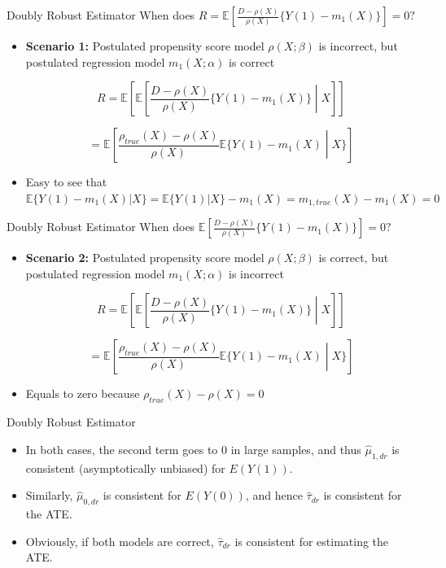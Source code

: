 \documentclass{beamer}
\begin{document}
\begin{frame}{Doubly Robust Estimator}
    When does \( R = \mathbb{E} \left[ \frac{D - \rho(X)}{\rho(X)} \{Y(1) - m_1(X)\} \right] = 0? \)

    \begin{itemize}
        \item \textbf{Scenario 1:} Postulated propensity score model \( \rho(X; \beta) \) is
        incorrect, but postulated regression model \( m_1(X; \alpha) \) is correct

        \[
        R = \mathbb{E} \left[ \mathbb{E} \left[ \frac{D - \rho(X)}{\rho(X)} \{Y(1) - m_1(X)\} \middle| X \right] \right]
        \]

        \[
        = \mathbb{E} \left[ \frac{\rho_{true}(X) - \rho(X)}{\rho(X)} \mathbb{E} \{Y(1) - m_1(X) \middle| X\} \right]
        \]

\item Easy to see that \( \mathbb{E} \{Y(1) - m_1(X) | X\} = \mathbb{E} \{Y(1) | X\} - m_1(X) = m_{1,true}(X) - m_1(X) = 0 \)

    \end{itemize}
\end{frame}


\begin{frame}{Doubly Robust Estimator}
    When does \( \mathbb{E} \left[ \frac{D - \rho(X)}{\rho(X)} \{Y(1) - m_1(X)\} \right] = 0? \)

    \begin{itemize}
        \item \textbf{Scenario 2:} Postulated propensity score model \( \rho(X; \beta) \) is correct,
        but postulated regression model \( m_1(X; \alpha) \) is incorrect

        \[
        R = \mathbb{E} \left[ \mathbb{E} \left[ \frac{D - \rho(X)}{\rho(X)} \{Y(1) - m_1(X)\} \middle| X \right] \right]
        \]

        \[
        = \mathbb{E} \left[ \frac{\rho_{true}(X) - \rho(X)}{\rho(X)} \mathbb{E} \{Y(1) - m_1(X) \middle| X\} \right]
        \]

        \item Equals to zero because \( \rho_{true}(X) - \rho(X) = 0 \)
    \end{itemize}
\end{frame}




\begin{frame}{Doubly Robust Estimator}
    \begin{itemize}
        \item In both cases, the second term goes to 0 in large samples, and
        thus \( \hat{\mu}_{1,dr} \) is consistent (asymptotically unbiased) for \( E(Y(1)) \).
        \item Similarly, \( \hat{\mu}_{0,dr} \) is consistent for \( E(Y(0)) \), and hence \( \hat{\tau}_{dr} \)
        is consistent for the ATE.
        \item Obviously, if both models are correct, \( \hat{\tau}_{dr} \) is consistent for
        estimating the ATE.
    \end{itemize}
\end{frame}
\end{document}
